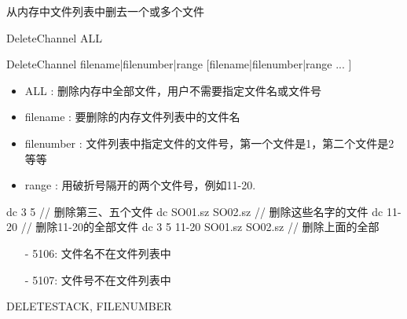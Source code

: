 \label{cmd:deletechannel}

从内存中文件列表中删去一个或多个文件

DeleteChannel ALL

DeleteChannel filename|filenumber|range [filename|filenumber|range ... ]

\begin{itemize}
\item ALL : 删除内存中全部文件，用户不需要指定文件名或文件号
\item filename : 要删除的内存文件列表中的文件名
\item filenumber : 文件列表中指定文件的文件号，第一个文件是1，第二个文件是2等等
\item range : 用破折号隔开的两个文件号，例如11-20.
\end{itemize}

\begin{SACCode}
  dc 3 5                         // 删除第三、五个文件
  dc SO01.sz SO02.sz             // 删除这些名字的文件
  dc 11-20                       // 删除11-20的全部文件
  dc 3 5 11-20 SO01.sz SO02.sz   // 删除上面的全部
\end{SACCode}

\begin{itemize}
\item[-]5106: 文件名不在文件列表中
\item[-]5107: 文件号不在文件列表中
\end{itemize}

DELETESTACK, FILENUMBER


